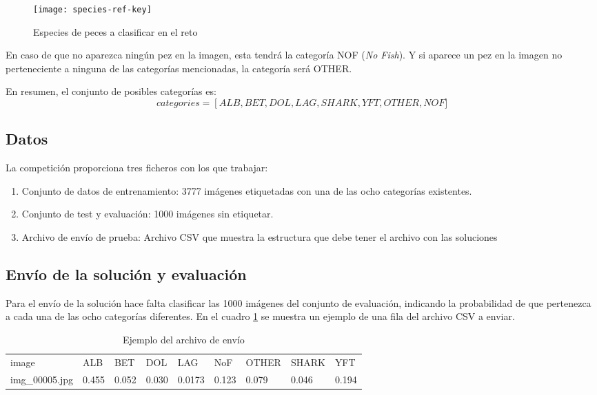 \begin{figure}
  \centering
  \caption{Especies de peces a clasificar en el reto}
\label{kaggle-fishes}
  \texttt{[image: species-ref-key]}
\end{figure}

En caso de que no aparezca ningún pez en la imagen, esta tendrá la categoría NOF (\textit{No Fish}). Y si aparece un pez en la imagen no perteneciente a ninguna de las categorías mencionadas, la categoría será OTHER.

En resumen, el conjunto de posibles categorías es:
\[
  categories =
  \left[ALB, BET, DOL, LAG, SHARK, YFT, OTHER, NOF]
\]

\subsection{Datos}

La competición proporciona tres ficheros con los que trabajar:

\begin{enumerate}
  \item{Conjunto de datos de entrenamiento: 3777 imágenes etiquetadas con una de las ocho categorías existentes.}
  \item{Conjunto de test y evaluación: 1000 imágenes sin etiquetar.}
  \item{Archivo de envío de prueba: Archivo CSV que muestra la estructura que debe tener el archivo con las soluciones}
\end{enumerate}

\subsection{Envío de la solución y evaluación}
\label{sec:envio-y-eval}

Para el envío de la solución hace falta clasificar las 1000 imágenes del conjunto de evaluación, indicando la probabilidad de que pertenezca a cada una de las ocho categorías diferentes. En el cuadro \ref{submission-sample} se muestra un ejemplo de una fila del archivo CSV a enviar.

\begin{table}[]
\centering
\caption{Ejemplo del archivo de envío}
\label{submission-sample}
\begin{tabular}{lllllllll}
image          & ALB   & BET   & DOL   & LAG    & NoF   & OTHER & SHARK  & YFT  \\
img\_00005.jpg & 0.455 & 0.052 & 0.030 & 0.0173 & 0.123 & 0.079 & 0.046 & 0.194\\
\end{tabular}
\end{table}

